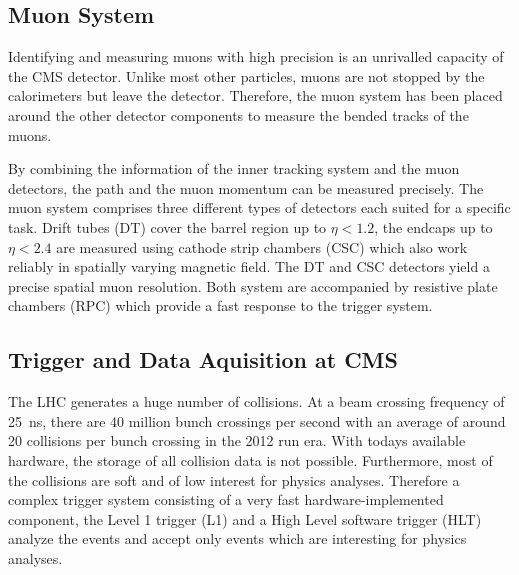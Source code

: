\subsection{Muon System}

Identifying and measuring muons with high precision is an unrivalled capacity of
the CMS detector. Unlike most other particles, muons are not stopped by the
calorimeters but leave the detector. Therefore, the muon system has been placed
around the other detector components to measure the bended tracks of the muons.

By combining the information of the inner tracking system and the muon
detectors, the path and the muon momentum can be measured precisely. The muon
system comprises three different types of detectors each suited for a specific
task. Drift tubes (DT) cover the barrel region up to $\eta < 1.2$, the endcaps
up to $\eta < 2.4$ are measured using cathode strip chambers (CSC) which also
work reliably in spatially varying magnetic field. The DT and CSC detectors
yield a precise spatial muon resolution. Both system are accompanied by
resistive plate chambers (RPC) which provide a fast response to the trigger
system.

\subsection{Trigger and Data Aquisition at CMS}

The LHC generates a huge number of collisions. At a beam crossing frequency of
\SI{25}{\nano \second}, there are 40 million bunch crossings per second with an
average of around 20 collisions per bunch crossing in the 2012 run era. With
todays available hardware, the storage of all collision data is not possible.
Furthermore, most of the collisions are soft and of low interest for physics
analyses. Therefore a complex trigger system consisting of a very fast
hardware-implemented component, the Level 1 trigger (L1) and a High Level
software trigger (HLT) analyze the events and accept only events which are
interesting for physics analyses.

